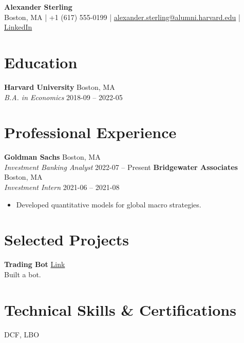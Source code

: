\documentclass[a4paper,10pt]{article}
\begin{document}
\begin{center}
    {\LARGE \textbf{Alexander Sterling}} \\
    \vspace{1mm}
    Boston, MA | +1 (617) 555-0199 | \href{mailto:alexander.sterling@alumni.harvard.edu}{alexander.sterling@alumni.harvard.edu} | \href{https://linkedin.com/in/alexander\_sterling}{LinkedIn}
\end{center}

\section*{Education}
\textbf{Harvard University} \hfill Boston, MA \\
\textit{B.A. in Economics} \hfill 2018-09 -- 2022-05
\vspace{1mm}

\section*{Professional Experience}
\textbf{Goldman Sachs} \hfill Boston, MA \\
\textit{Investment Banking Analyst} \hfill 2022-07 -- Present
\vspace{1.5mm}
\textbf{Bridgewater Associates} \hfill Boston, MA \\
\textit{Investment Intern} \hfill 2021-06 -- 2021-08
\begin{itemize}[leftmargin=1.5em,noitemsep,topsep=0.2em]
        \item Developed quantitative models for global macro strategies.
    \end{itemize}
\vspace{1.5mm}

\section*{Selected Projects}
\textbf{Trading Bot} \hfill \href{https://github.com/asterling/bot}{Link} \\
Built a bot.
\vspace{1.5mm}

\section*{Technical Skills \& Certifications}
\begin{description}[style=multiline,leftmargin=4cm,font=\bfseries,noitemsep]
        \item[Finance:] DCF, LBO
        \item[EmptySkills:] 
    \end{description}
\end{document}
